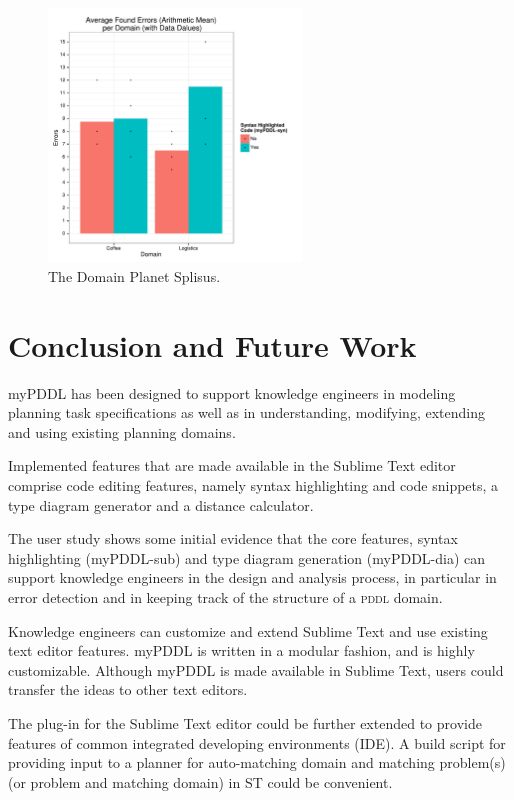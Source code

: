 \documentclass[a4paper,12pt]{report}
\newcommand{\mypddl}{\smallerft[0.8]{myPDDL}\xspace}
\newcommand{\pddl}{\textsc{pddl}\xspace}
\newcommand\smallerft[2][0.85]{{\scalefont{#1}#2}}
\begin{document}
\begin{enumerate}
  \begin{figure}[h]
    \centering
    \includegraphics[width=0.6\textwidth]{found-errors-splitted.pdf}
\caption[]{\label{fig:planet-splisus}The Domain Planet Splisus.}
  \end{figure}
\end{enumerate}
\chapter{Conclusion and Future Work}
\label{sec-6}
\label{ch:conclusion}

\mypddl has been designed to support knowledge engineers in modeling
planning task specifications as well as in understanding, modifying,
extending and using existing planning domains.

Implemented features that are made available in the Sublime Text
editor comprise code editing features, namely syntax highlighting and
code snippets, a type diagram generator and a distance calculator.

The user study shows some initial evidence that the core features,
syntax highlighting (\mypddl-sub) and type diagram generation
(\mypddl-dia) can support knowledge engineers in the design and
analysis process, in particular in error detection and in keeping
track of the structure of a \pddl domain.

Knowledge engineers can customize and extend Sublime Text and use
existing text editor features. \mypddl is written in a modular
fashion, and is highly customizable. Although \mypddl is made
available in Sublime Text, users could transfer the ideas to other
text editors.

The plug-in for the Sublime Text editor could be further extended to
provide features of common integrated developing environments (IDE). A
build script for providing input to a planner for auto-matching domain
and matching problem(s) (or problem and matching domain) in ST could
be convenient.
\end{document}
